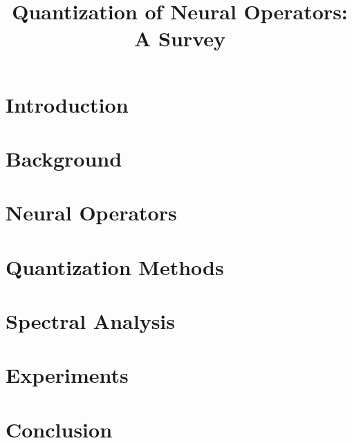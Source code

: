 \documentclass{article}
\title{Quantization of Neural Operators: A Survey}
\author{}
\date{}
\begin{document}
\maketitle

\section{Introduction}

\section{Background}

\section{Neural Operators}

\section{Quantization Methods}

\section{Spectral Analysis}

\section{Experiments}

\section{Conclusion}

\printbibliography
\end{document}
